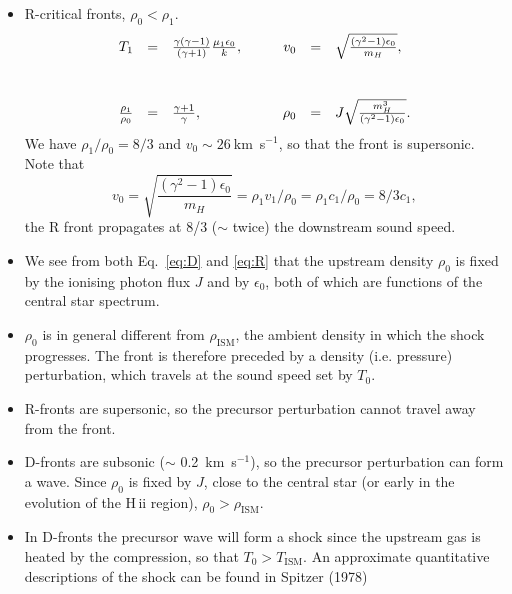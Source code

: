 \begin{itemize}
\item R-critical fronts, $\rho_0 < \rho_1$.
\begin{equation} \label{eq:R}
\begin{array}{rclcrcl}
T_1 &  =  &  \frac{ \gamma( \gamma-1) }{ (\gamma + 1) } \frac{\mu_1
  \epsilon_0}{k},  &   ~~~  &  v_0  & = & \sqrt{
  \frac{ (\gamma^2 - 1) \epsilon_0 }{  m_H}
},  \vspace{1cm} \\ 
\frac{\rho_1}{\rho_0} &  = &  \frac{\gamma+1}{\gamma},  & ~~~  &
\rho_0 &  = &  J \sqrt{  \frac{ m_H^3}{ (\gamma^2 -1)\epsilon_0}}. 
\end{array}
\end{equation}
We have $\rho_1 / \rho_0 = 8/3$ and $v_0 \sim 26~$km~s$^{-1}$, so that
the front is supersonic. Note that 
\[
v_0 = \sqrt{\frac{ (\gamma^2 - 1) \epsilon_0 }{m_H}} = \rho_1 v_1  /
\rho_0 = \rho_1 c_1 / \rho_0 = 8/3 c_1, 
\]
the R front propagates at 8/3 ($\sim$ twice) the downstream sound speed.

\end{itemize}





\begin{itemize}


\item We see from both Eq.~\ref{eq:D} and \ref{eq:R} that the
  upstream density $\rho_0$ is fixed by the ionising photon flux $J$
  and by $\epsilon_0$, both of which are functions of the central star
  spectrum. 

\item $\rho_0$ is in general different from $\rho_\mathrm{ISM}$, the
  ambient density in which the shock progresses. The front is
  therefore preceded by a density (i.e. pressure) perturbation, which
  travels at the sound speed set by $T_0$.

\item R-fronts are supersonic, so the precursor perturbation cannot
  travel away from the front.

\item D-fronts are subsonic ($\sim$ 0.2~km~s$^{-1}$), so the precursor
  perturbation can form a wave. Since $\rho_0$ is fixed by $J$, close
  to the central star (or early in the evolution of the H\,{\sc ii}
  region), $\rho_0 > \rho_\mathrm{ISM}$. 

\item In D-fronts the precursor wave will form a shock since the
  upstream gas is heated by the compression, so that $T_0 >
  T_\mathrm{ISM}$.  An approximate quantitative descriptions of the
  shock can be found in Spitzer (1978)

\end{itemize}



